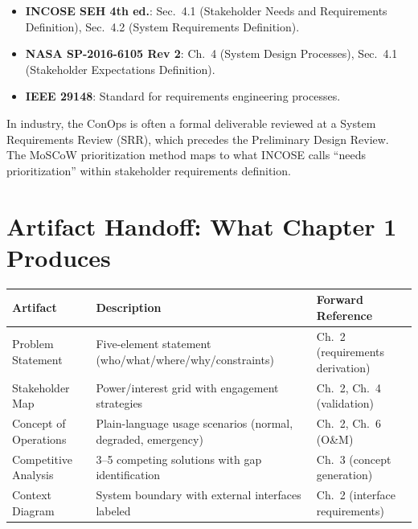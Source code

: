 \documentclass[11pt,letterpaper,twoside,openany]{book}
\begin{document}
\begin{keyconceptbox}
\begin{itemize}[nosep,leftmargin=1.5em]
\item \textbf{INCOSE SEH 4th ed.}: Sec.\ 4.1 (Stakeholder Needs and Requirements Definition), Sec.\ 4.2 (System Requirements Definition).
\item \textbf{NASA SP-2016-6105 Rev 2}: Ch.\ 4 (System Design Processes), Sec.\ 4.1 (Stakeholder Expectations Definition).
\item \textbf{IEEE 29148}: Standard for requirements engineering processes.
\end{itemize}
In industry, the ConOps is often a formal deliverable reviewed at a System Requirements Review (SRR), which precedes the Preliminary Design Review. The MoSCoW prioritization method maps to what INCOSE calls ``needs prioritization'' within stakeholder requirements definition.
\end{keyconceptbox}

\section{Artifact Handoff: What Chapter 1 Produces}
\begin{table}[htbp]\centering\small
\begin{tabularx}{\textwidth}{l X l}
\toprule
\textbf{Artifact} & \textbf{Description} & \textbf{Forward Reference} \\
\midrule
Problem Statement & Five-element statement (who/what/where/why/constraints) & Ch.~2 (requirements derivation) \\
Stakeholder Map & Power/interest grid with engagement strategies & Ch.~2, Ch.~4 (validation) \\
Concept of Operations & Plain-language usage scenarios (normal, degraded, emergency) & Ch.~2, Ch.~6 (O\&M) \\
Competitive Analysis & 3--5 competing solutions with gap identification & Ch.~3 (concept generation) \\
Context Diagram & System boundary with external interfaces labeled & Ch.~2 (interface requirements) \\
\bottomrule
\end{tabularx}
\end{table}
\end{document}
